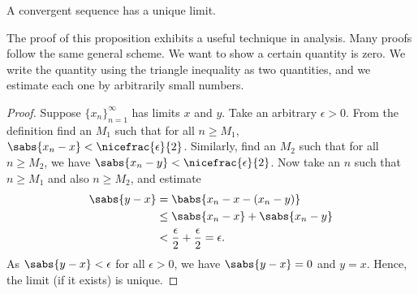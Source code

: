 \begin{prop} \label{prop:limisunique}
A convergent sequence has a unique limit.
\end{prop}

The proof of this proposition exhibits a useful technique in
analysis.  Many proofs follow the same general scheme.  We want to
show a certain quantity is zero.  We write the quantity using the 
triangle inequality as two quantities, and we estimate each one
by arbitrarily small numbers.

\begin{proof}
Suppose $\{ x_n \}_{n=1}^\infty$ has limits $x$ and $y$.
Take an arbitrary $\epsilon > 0$.
From the definition find an $M_1$ such that for all $n \geq M_1$,
$\sabs{x_n-x} < \nicefrac{\epsilon}{2}$.  Similarly, find an $M_2$
such that for all $n \geq M_2$, we have
$\sabs{x_n-y} < \nicefrac{\epsilon}{2}$.
Now take an $n$ such that $n \geq M_1$ and also $n \geq M_2$, and estimate
\begin{equation*}
\begin{split}
\sabs{y-x}
& =
\babs{x_n-x - (x_n -y)} \\
& \leq
\sabs{x_n-x} + \sabs{x_n -y} \\
& <
\frac{\epsilon}{2} + \frac{\epsilon}{2} = \epsilon .
\end{split}
\end{equation*}
As $\sabs{y-x} < \epsilon$ for all $\epsilon > 0$, we have $\sabs{y-x} = 0$
and $y=x$.  Hence, the limit (if it exists) is unique.
\end{proof}

